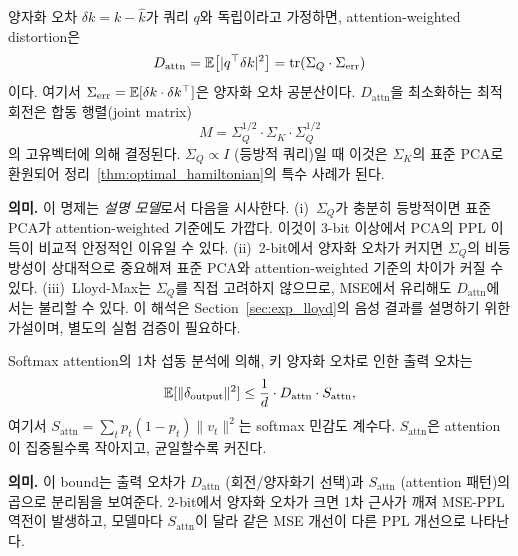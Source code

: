 \begin{proposition}
\label{prop:attn_weighted}
양자화 오차 $\delta k = k - \hat{k}$가 쿼리 $q$와 독립이라고 가정하면, attention-weighted distortion은
\begin{equation}
D_{\mathrm{attn}} = \mathbb{E}\bigl[\lvert q^\top \delta k \rvert^2\bigr] = \mathrm{tr}(\Sigma_Q \cdot \Sigma_{\mathrm{err}})
\end{equation}
이다. 여기서 $\Sigma_{\mathrm{err}} = \mathbb{E}[\delta k \cdot \delta k^\top]$은 양자화 오차 공분산이다. $D_{\mathrm{attn}}$을 최소화하는 최적 회전은 합동 행렬(joint matrix)
\begin{equation}
M = \Sigma_Q^{1/2} \cdot \Sigma_K \cdot \Sigma_Q^{1/2}
\end{equation}
의 고유벡터에 의해 결정된다. $\Sigma_Q \propto I$ (등방적 쿼리)일 때 이것은 $\Sigma_K$의 표준 PCA로 환원되어 정리~\ref{thm:optimal_hamiltonian}의 특수 사례가 된다.
\end{proposition}

\begin{theorycomment}
\textbf{의미.} 이 명제는 \emph{설명 모델}로서 다음을 시사한다. (i)~$\Sigma_Q$가 충분히 등방적이면 표준 PCA가 attention-weighted 기준에도 가깝다. 이것이 3-bit 이상에서 PCA의 PPL 이득이 비교적 안정적인 이유일 수 있다. (ii)~2-bit에서 양자화 오차가 커지면 $\Sigma_Q$의 비등방성이 상대적으로 중요해져 표준 PCA와 attention-weighted 기준의 차이가 커질 수 있다. (iii)~Lloyd-Max는 $\Sigma_Q$를 직접 고려하지 않으므로, MSE에서 유리해도 $D_{\mathrm{attn}}$에서는 불리할 수 있다. 이 해석은 Section~\ref{sec:exp_lloyd}의 음성 결과를 설명하기 위한 가설이며, 별도의 실험 검증이 필요하다.
\end{theorycomment}

\begin{proposition}
\label{prop:attn_error_bound}
Softmax attention의 1차 섭동 분석에 의해, 키 양자화 오차로 인한 출력 오차는
\begin{equation}
\mathbb{E}[\lVert \delta_{\mathrm{output}} \rVert^2] \leq \frac{1}{d} \cdot D_{\mathrm{attn}} \cdot S_{\mathrm{attn}},
\end{equation}
여기서 $S_{\mathrm{attn}} = \sum_t p_t(1-p_t) \lVert v_t \rVert^2$는 softmax 민감도 계수다. $S_{\mathrm{attn}}$은 attention이 집중될수록 작아지고, 균일할수록 커진다.
\end{proposition}

\begin{theorycomment}
\textbf{의미.} 이 bound는 출력 오차가 $D_{\mathrm{attn}}$ (회전/양자화기 선택)과 $S_{\mathrm{attn}}$ (attention 패턴)의 곱으로 분리됨을 보여준다. 2-bit에서 양자화 오차가 크면 1차 근사가 깨져 MSE-PPL 역전이 발생하고, 모델마다 $S_{\mathrm{attn}}$이 달라 같은 MSE 개선이 다른 PPL 개선으로 나타난다.
\end{theorycomment}

